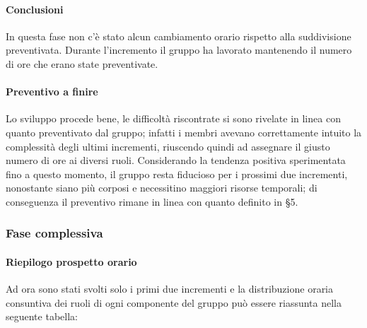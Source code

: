 		\paragraph{Conclusioni}
			In questa fase non c'è stato alcun cambiamento orario rispetto alla suddivisione preventivata.
			Durante l'incremento il gruppo ha lavorato mantenendo il numero di ore che erano state preventivate. 
		
		\paragraph{Preventivo a finire}
			Lo sviluppo procede bene, le difficoltà riscontrate si sono rivelate in linea con quanto preventivato dal gruppo; infatti i membri avevano correttamente intuito la complessità degli ultimi incrementi, riuscendo quindi ad assegnare il giusto numero di ore ai diversi ruoli.
			\newline
			Considerando la tendenza positiva sperimentata fino a questo momento, il gruppo resta fiducioso per i prossimi due incrementi, nonostante siano più corposi e necessitino maggiori risorse temporali; di conseguenza il preventivo rimane in linea con quanto definito in \S5.
		\pagebreak
		\subsubsection{Fase complessiva}
		
		\paragraph{Riepilogo prospetto orario}
			Ad ora sono stati svolti solo i primi due incrementi e la distribuzione oraria consuntiva dei ruoli di ogni componente del gruppo può essere riassunta nella seguente tabella:
			
